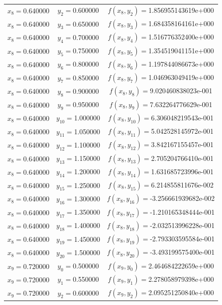 \begin{longtable}{ccc}
$x_{8}=$0.640000 & $y_{2}=$0.600000 & $f(x_{8},y_{2})=$1.856955143619e+000 \\
$x_{8}=$0.640000 & $y_{3}=$0.650000 & $f(x_{8},y_{3})=$1.684358164161e+000 \\
$x_{8}=$0.640000 & $y_{4}=$0.700000 & $f(x_{8},y_{4})=$1.516776352400e+000 \\
$x_{8}=$0.640000 & $y_{5}=$0.750000 & $f(x_{8},y_{5})=$1.354519041151e+000 \\
$x_{8}=$0.640000 & $y_{6}=$0.800000 & $f(x_{8},y_{6})=$1.197844086673e+000 \\
$x_{8}=$0.640000 & $y_{7}=$0.850000 & $f(x_{8},y_{7})=$1.046963049419e+000 \\
$x_{8}=$0.640000 & $y_{8}=$0.900000 & $f(x_{8},y_{8})=$9.020460838023e-001 \\
$x_{8}=$0.640000 & $y_{9}=$0.950000 & $f(x_{8},y_{9})=$7.632264776629e-001 \\
$x_{8}=$0.640000 & $y_{10}=$1.000000 & $f(x_{8},y_{10})=$6.306048219543e-001 \\
$x_{8}=$0.640000 & $y_{11}=$1.050000 & $f(x_{8},y_{11})=$5.042528145972e-001 \\
$x_{8}=$0.640000 & $y_{12}=$1.100000 & $f(x_{8},y_{12})=$3.842167155457e-001 \\
$x_{8}=$0.640000 & $y_{13}=$1.150000 & $f(x_{8},y_{13})=$2.705204766410e-001 \\
$x_{8}=$0.640000 & $y_{14}=$1.200000 & $f(x_{8},y_{14})=$1.631685723996e-001 \\
$x_{8}=$0.640000 & $y_{15}=$1.250000 & $f(x_{8},y_{15})=$6.214855811676e-002 \\
$x_{8}=$0.640000 & $y_{16}=$1.300000 & $f(x_{8},y_{16})=$-3.256661939682e-002 \\
$x_{8}=$0.640000 & $y_{17}=$1.350000 & $f(x_{8},y_{17})=$-1.210165348444e-001 \\
$x_{8}=$0.640000 & $y_{18}=$1.400000 & $f(x_{8},y_{18})=$-2.032513996228e-001 \\
$x_{8}=$0.640000 & $y_{19}=$1.450000 & $f(x_{8},y_{19})=$-2.793303595584e-001 \\
$x_{8}=$0.640000 & $y_{20}=$1.500000 & $f(x_{8},y_{20})=$-3.493199575400e-001 \\
$x_{9}=$0.720000 & $y_{0}=$0.500000 & $f(x_{9},y_{0})=$2.464684222659e+000 \\
$x_{9}=$0.720000 & $y_{1}=$0.550000 & $f(x_{9},y_{1})=$2.278058979398e+000 \\
$x_{9}=$0.720000 & $y_{2}=$0.600000 & $f(x_{9},y_{2})=$2.095251250840e+000 \\

\end{longtable}
